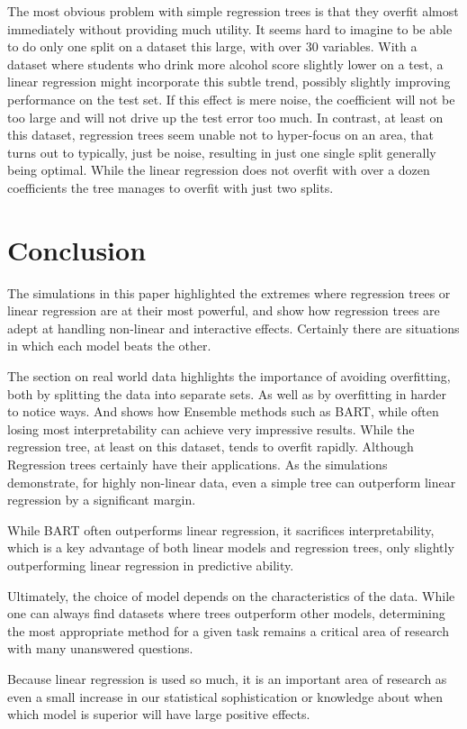 \documentclass[12pt]{article}
\begin{document}
The most obvious problem with simple regression trees is that they overfit almost immediately without providing much utility. It seems hard to imagine to be able to do only one split on a dataset this large, with over 30 variables. With a dataset where students who drink more alcohol score slightly lower on a test, a linear regression might incorporate this subtle trend, possibly slightly improving performance on the test set. If this effect is mere noise, the coefficient will not be too large and will not drive up the test error too much. In contrast, at least on this dataset, regression trees seem unable not to hyper-focus on an area, that turns out to typically, just be noise, resulting in just one single split generally being optimal. While the linear regression does not overfit with over a dozen coefficients the tree manages to overfit with just two splits.


\section{Conclusion}

The simulations in this paper highlighted the extremes where regression trees or linear regression are at their most powerful, and show how regression trees are adept at handling non-linear and interactive effects. Certainly there are situations in which each model beats the other.

The section on real world data highlights the importance of avoiding overfitting, both by splitting the data into separate sets. As well as by overfitting in harder to notice ways. And shows how Ensemble methods such as BART, while often losing most interpretability can achieve very impressive results. While the regression tree, at least on this dataset, tends to overfit rapidly. Although Regression trees certainly have their applications. As the simulations demonstrate, for highly non-linear data, even a simple tree can outperform linear regression by a significant margin.

While BART often outperforms linear regression, it sacrifices interpretability, which is a key advantage of both linear models and regression trees, only slightly outperforming linear regression in predictive ability.

Ultimately, the choice of model depends on the characteristics of the data. While one can always find datasets where trees outperform other models, determining the most appropriate method for a given task remains a critical area of research with many unanswered questions.

Because linear regression is used so much, it is an important area of research as even a small increase in our statistical sophistication or knowledge about when which model is superior will have large positive effects.



\end{document}
